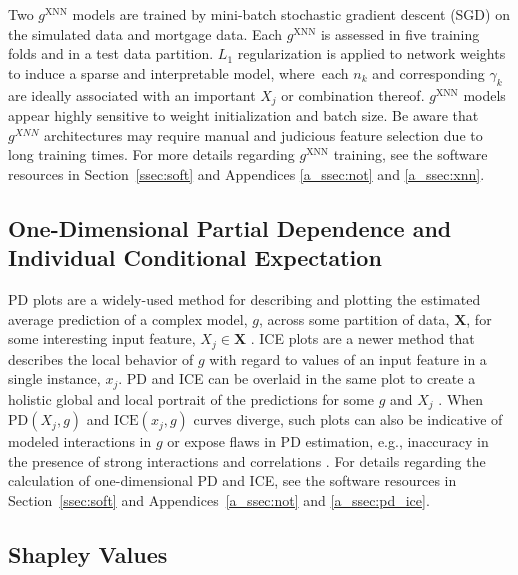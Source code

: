 \documentclass[information,article,accept,moreauthors,pdftex]{Definitions/mdpi}
\begin{document}
Two $g^\text{XNN}$ models are trained by mini-batch stochastic gradient descent (SGD) on the simulated data and mortgage data. Each $g^\text{XNN}$ is assessed in five training folds and in a test data partition. $L_1$ regularization is applied to network weights to induce a sparse and interpretable model, where~each $n_k$ and corresponding $\gamma_k$ are ideally associated with an important $X_j$ or combination thereof. $g^\text{XNN}$ models appear highly sensitive to weight initialization and batch size. Be aware that $g^{XNN}$ architectures may require manual and judicious feature selection due to long training times. For more details regarding $g^\text{XNN}$ training, see the software resources in Section~\ref{ssec:soft} and Appendices  \ref{a_ssec:not} and \ref{a_ssec:xnn}.

\subsection{One-Dimensional Partial Dependence and Individual Conditional Expectation}\label{ssec:pd_ice}

PD plots are a widely-used method for describing and plotting the estimated average prediction of a complex model, $g$, across some partition of data, $\mathbf{X}$, for some interesting input feature, $X_j \in \mathbf{X}$ \cite{esl}. ICE plots are a newer method that describes the local behavior of $g$ with regard to values of an input feature in a single instance, $x_j$. PD and ICE can be overlaid in the same plot to create a holistic global and local portrait of the predictions for some $g$ and $X_j$ \cite{ice_plots}. When $\text{PD}(X_j, g)$ and $\text{ICE}(x_j,  g)$ curves diverge, such plots can also be indicative of modeled interactions in $g$ or expose flaws in PD estimation, e.g., inaccuracy in the presence of strong interactions and correlations \cite{ice_plots,ale_plot}.  For details regarding the calculation of one-dimensional PD and ICE, see the software resources in Section~\ref{ssec:soft} and Appendices~\ref{a_ssec:not} and \ref{a_ssec:pd_ice}.

\subsection{Shapley Values}\label{ssec:shap}
\end{document}
